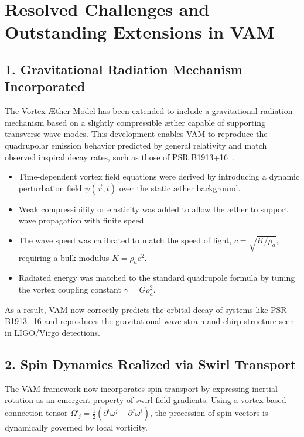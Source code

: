 \section{Resolved Challenges and Outstanding Extensions in VAM}
\subsection*{1. Gravitational Radiation Mechanism Incorporated}

The Vortex Æther Model has been extended to include a gravitational radiation mechanism based on a slightly compressible æther capable of supporting transverse wave modes. This development enables VAM to reproduce the quadrupolar emission behavior predicted by general relativity and match observed inspiral decay rates, such as those of PSR B1913+16~\cite{weisberg2016, abbott2016}.

\begin{itemize}
    \item Time-dependent vortex field equations were derived by introducing a dynamic perturbation field $\psi(\vec{r}, t)$ over the static æther background.
    \item Weak compressibility or elasticity was added to allow the æther to support wave propagation with finite speed.
    \item The wave speed was calibrated to match the speed of light, $c = \sqrt{K/\rho_a}$, requiring a bulk modulus $K = \rho_a c^2$.
    \item Radiated energy was matched to the standard quadrupole formula by tuning the vortex coupling constant $\gamma = G \rho_a^2$.
\end{itemize}

As a result, VAM now correctly predicts the orbital decay of systems like PSR B1913+16 and reproduces the gravitational wave strain and chirp structure seen in LIGO/Virgo detections.


\subsection*{2. Spin Dynamics Realized via Swirl Transport}

The VAM framework now incorporates spin transport by expressing inertial rotation as an emergent property of swirl field gradients. Using a vortex-based connection tensor \( \Omega^i_{\;j} = \frac{1}{2} (\partial^i \omega^j - \partial^j \omega^i) \), the precession of spin vectors is dynamically governed by local vorticity.

